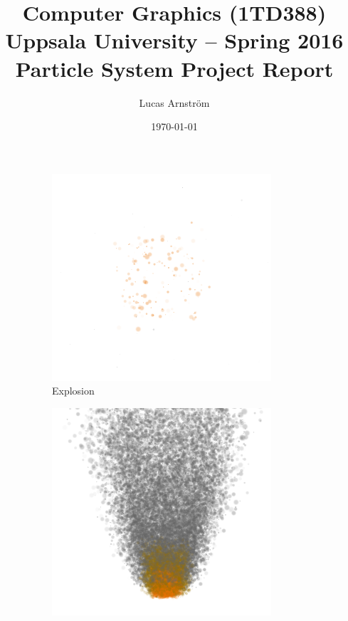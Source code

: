 \documentclass[a4paper]{article}
\title{Computer Graphics (1TD388) \\ Uppsala University -- Spring 2016 \\ Particle System Project Report}
\author{Lucas Arnström}
\date{\today}
\begin{document}
\maketitle

\begin{figure}[htbp]
    \centering
    \begin{subfigure}[ht]{0.22\textwidth}
        \includegraphics[width=\textwidth]{figures/explosion.png}
        \caption{Explosion}
        \label{fig:simulations_explosion}
    \end{subfigure}
    \begin{subfigure}[ht]{0.22\textwidth}
        \includegraphics[width=\textwidth]{figures/fire.png}

\end{subfigure}
\end{figure}
\end{document}
